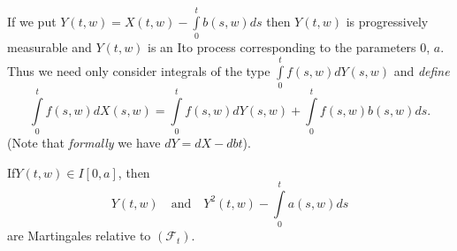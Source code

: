 \begin{remark*}
If we put $Y(t,w)=X(t,w)-\int\limits^{t}_{0}b(s,w)ds$ then $Y(t,w)$ is
progressively measurable and $Y(t,w)$ is an Ito process corresponding
to the parameters $0$, $a$. Thus we need only consider integrals of
the type $\int\limits^{t}_{0}f(s,w)dY(s,w)$ and {\em define}
$$
\int\limits^{t}_{0}f(s,w)dX(s,w)=\int\limits^{t}_{0}f(s,w)dY(s,w)+\int\limits^{t}_{0}f(s,w)b(s,w)ds.
$$
(Note that {\em formally} we have $dY=dX-dbt$).
\end{remark*}

\begin{lemma*}
If\pageoriginale $Y(t,w)\in I[0,a]$, then
$$
Y(t,w)\quad\text{and}\quad Y^{2}(t,w)-\int\limits^{t}_{0}a(s,w)ds
$$
are Martingales relative to $(\mathscr{F}_{t})$.
\end{lemma*}

